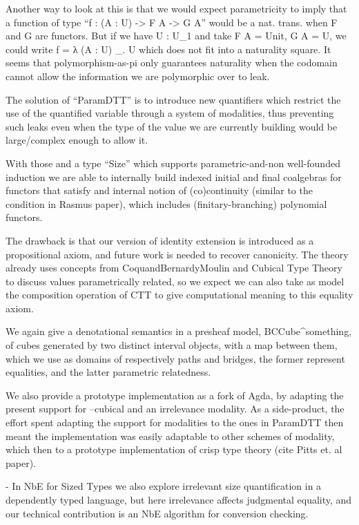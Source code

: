     Another way to look at this is that we would expect parametricity
    to imply that a function of type ``f : (A : U) -> F A -> G A''
    would be a nat. trans. when F and G are functors.  But if we have
    U : U_1 and take F A = Unit, G A = U, we could write
    f = λ (A : U) _. U which does not fit into a naturality square.
    It seems that polymorphism-as-pi only guarantees naturality when
    the codomain cannot allow the information we are polymorphic over
    to leak.

    The solution of ``ParamDTT'' is to introduce new quantifiers which
    restrict the use of the quantified variable through a system of
    modalities, thus preventing such leaks even when the type of the
    value we are currently building would be large/complex enough to
    allow it.

    With those and a type ``Size'' which supports parametric-and-non
    well-founded induction we are able to internally build indexed
    initial and final coalgebras for functors that satisfy and
    internal notion of (co)continuity (similar to the condition in
    Rasmus paper), which includes (finitary-branching) polynomial
    functors.

    The drawback is that our version of identity extension is
    introduced as a propositional axiom, and future work is needed to
    recover canonicity. The theory already uses concepts from
    CoquandBernardyMoulin and Cubical Type Theory to discuss values
    parametrically related, so we expect we can also take as model the
    composition operation of CTT to give computational meaning to this
    equality axiom.

    We again give a denotational semantics in a presheaf model,
    BCCube^\hat something, of cubes generated by two distinct interval
    objects, with a map between them, which we use as domains of
    respectively paths and bridges, the former represent equalities,
    and the latter parametric relatedness.

    We also provide a prototype implementation as a fork of Agda, by
    adapting the present support for --cubical and an irrelevance
    modality. As a side-product, the effort spent adapting the support
    for modalities to the ones in ParamDTT then meant the
    implementation was easily adaptable to other schemes of modality,
    which then to a prototype implementation of crisp type theory
    (cite Pitts et. al paper).

    
    - In NbE for Sized Types we also explore irrelevant size
    quantification in a dependently typed language, but here
    irrelevance affects judgmental equality, and our technical
    contribution is an NbE algorithm for conversion checking.
    
